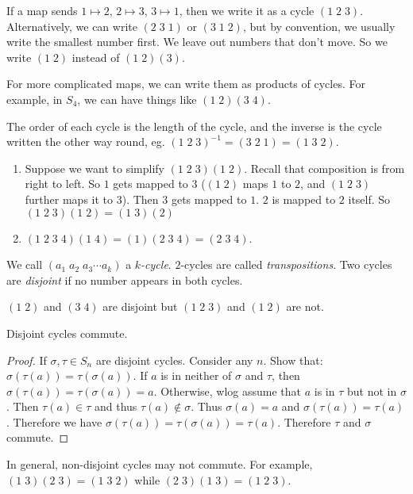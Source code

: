 \documentclass[a4paper]{article}
\begin{document}
\begin{notation}
  If a map sends $1 \mapsto 2$, $2\mapsto 3$, $3\mapsto 1$, then we write it as a cycle $(1\;2\;3)$. Alternatively, we can write $(2\;3\;1)$ or $(3\;1\;2)$, but by convention, we usually write the smallest number first. We leave out numbers that don't move. So we write $(1\; 2)$ instead of $(1\; 2)(3)$.

  For more complicated maps, we can write them as products of cycles. For example, in $S_4$, we can have things like $(1\; 2)(3\; 4)$.
\end{notation}
The order of each cycle is the length of the cycle, and the inverse is the cycle written the other way round, eg. $(1\; 2\; 3)^{-1} = (3\; 2\; 1) = (1\; 3\; 2)$.

\begin{eg}\leavevmode
  \begin{enumerate}
    \item Suppose we want to simplify $(1\; 2\; 3)(1\; 2)$. Recall that composition is from right to left. So $1$ gets mapped to $3$ ($(1\; 2)$ maps $1$ to $2$, and $(1\; 2\; 3)$ further maps it to $3$). Then $3$ gets mapped to $1$. $2$ is mapped to $2$ itself. So $(1\; 2\; 3)(1\; 2) = (1\;3)(2)$
    \item $(1\; 2\; 3\; 4)(1\; 4) = (1)(2\; 3\; 4) = (2\; 3\; 4)$.
  \end{enumerate}
\end{eg}
\begin{defi}
  We call $(a_1\; a_2\; a_3\cdots a_k)$ a \emph{$k$-cycle}. $2$-cycles are called \emph{transpositions}. Two cycles are \emph{disjoint} if no number appears in both cycles.
\end{defi}
\begin{eg}
  $(1\; 2)$ and $(3\; 4)$ are disjoint but $(1\; 2\; 3)$ and $(1\; 2)$ are not.
\end{eg}
\begin{lemma}
  Disjoint cycles commute.
\end{lemma}
\begin{proof}
  If $\sigma, \tau\in S_n$ are disjoint cycles. Consider any $n$. Show that: $\sigma(\tau(a)) = \tau(\sigma(a))$. If $a$ is in neither of $\sigma$ and $\tau$, then $\sigma(\tau(a)) = \tau(\sigma(a)) = a$. Otherwise, wlog assume that $a$ is in $\tau$ but not in $\sigma$. Then $\tau(a)\in \tau$ and thus $\tau(a)\not\in \sigma$. Thus $\sigma(a) = a$ and $\sigma(\tau(a)) = \tau(a)$. Therefore we have $\sigma(\tau(a)) = \tau(\sigma(a)) = \tau(a)$. Therefore $\tau$ and $\sigma$ commute.
\end{proof}
In general, non-disjoint cycles may not commute. For example, $(1\; 3)(2\; 3) = (1\; 3\; 2)$ while $(2\; 3)(1\; 3) = (1\; 2\; 3)$.
\end{document}
